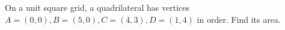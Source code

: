 On a unit square grid, a quadrilateral has vertices $A=(0,0),B=(5,0),C=(4,3),D=(1,4)$ in order. Find its area.
